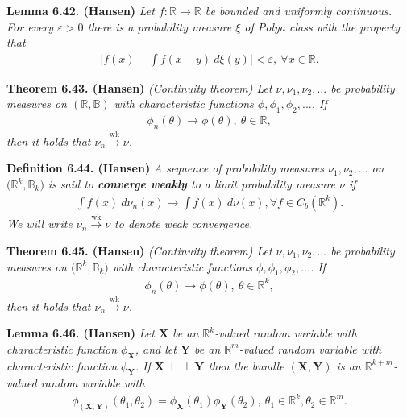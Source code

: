\documentclass[a4paper,10pt,openany]{book}
\begin{document}
\textbf{Lemma 6.42. (Hansen)} \emph{Let \(f : \mathbb{R}\to\mathbb{R}\) be bounded and uniformly continuous. For every \(\varepsilon>0\) there is a probability measure \(\xi\) of Polya class with the property that}
\begin{align*}
    \Big\vert f(x)-\int f(x+y)\ d\xi(y)\Big\vert<\varepsilon,\ \forall x\in\mathbb{R}.\tag{6.43}
\end{align*}

\textbf{Theorem 6.43. (Hansen)} \emph{(Continuity theorem) Let \(\nu,\nu_1,\nu_2,...\) be probability measures on \((\mathbb{R},\mathbb{B})\) with characteristic functions \(\phi,\phi_1,\phi_2,...\). If}
\begin{align*}
    \phi_n(\theta)\to \phi(\theta),\ \theta\in\mathbb{R},\tag{6.45}
\end{align*}
\emph{then it holds that \(\nu_n\stackrel{\text{wk}}{\to}\nu\).}

\textbf{Definition 6.44. (Hansen)} \emph{A sequence of probability measures \(\nu_1,\nu_2,...\) on \(\big(\mathbb{R}^k,\mathbb{B}_k\big)\) is said to \textbf{converge weakly} to a limit probability measure \(\nu\) if}
\begin{align*}
    \int f(x)\ d\nu_n(x)\to\int f(x)\ d\nu(x), \forall f\in C_b(\mathbb{R}^k).\tag{6.46}
\end{align*}
\emph{We will write \(\nu_n\stackrel{\text{wk}}{\to}\nu\) to denote weak convergence.}

\textbf{Theorem 6.45. (Hansen)} \emph{(Continuity theorem) Let \(\nu,\nu_1,\nu_2,...\) be probability measures on \(\big(\mathbb{R}^k,\mathbb{B}_k\big)\) with characteristic functions \(\phi,\phi_1,\phi_2,...\). If}
\begin{align*}
    \phi_n(\theta)\to \phi(\theta),\ \theta\in\mathbb{R}^k,\tag{6.47}
\end{align*}
\emph{then it holds that \(\nu_n\stackrel{\text{wk}}{\to}\nu\).}

\textbf{Lemma 6.46. (Hansen)} \emph{Let \(\mathbf{X}\) be an \(\mathbb{R}^k\)-valued random variable with characteristic function \(\phi_\mathbf{X}\), and let \(\mathbf{Y}\) be an \(\mathbb{R}^m\)-valued random variable with characteristic function \(\phi_\mathbf{Y}\). If \(\mathbf{X} \perp \!\!\! \perp \mathbf{Y}\) then the bundle \((\mathbf{X},\mathbf{Y})\) is an \(\mathbb{R}^{k+m}\)-valued random variable with}
\begin{align*}
    \phi_{(\mathbf{X},\mathbf{Y})}(\theta_1,\theta_2)=\phi_\mathbf{X}(\theta_1)\phi_\mathbf{Y}(\theta_2),\ \theta_1\in\mathbb{R}^k,\theta_2\in\mathbb{R}^m.\tag{6.49}
\end{align*}
\end{document}
